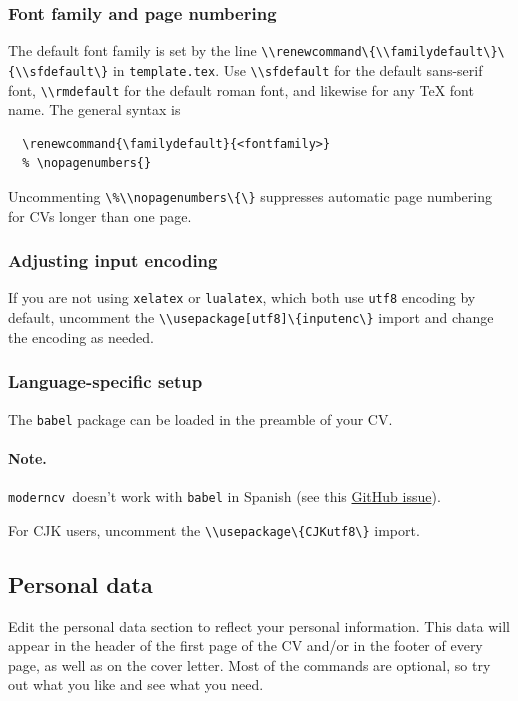 \documentclass[a4paper, 11pt]{article}
\newcommand{\note}{\paragraph{Note.}}
\newcommand{\code}[1]{\lstinline!#1!}
\newcommand{\moderncv}{\code{moderncv}}
\newcommand{\Moderncv}{\moderncv~}
\newcommand{\cvtemplate}{\code{template.tex}}
\begin{document}
\subsubsection*{Font family and page numbering}
The default font family is set by the line \code{\\renewcommand\{\\familydefault\}\{\\sfdefault\}} in \cvtemplate.
Use \code{\\sfdefault} for the default sans-serif font, \code{\\rmdefault} for the default roman font, and likewise for any \TeX{} font name.
The general syntax is
\begin{lstlisting}
  \renewcommand{\familydefault}{<fontfamily>}
  % \nopagenumbers{}
\end{lstlisting}
Uncommenting \code{\%\\nopagenumbers\{\}} suppresses automatic page numbering for CVs longer than one page.

\subsubsection*{Adjusting input encoding}
If you are not using \code{xelatex} or \code{lualatex}, which both use \code{utf8} encoding by default, uncomment the \code{\\usepackage[utf8]\{inputenc\}} import and change the encoding as needed.

\subsubsection{Language-specific setup}
The \code{babel} package can be loaded in the preamble of your CV.

\note \Moderncv doesn't work with \code{babel} in Spanish (see this \href{https://github.com/moderncv/moderncv/issues/103}{GitHub issue}).

For CJK users, uncomment the \code{\\usepackage\{CJKutf8\}} import.

\subsection{Personal data}
Edit the personal data section to reflect your personal information.
This data will appear in the header of the first page of the CV and/or in the footer of every page, as well as on the cover letter.
Most of the commands are optional, so try out what you like and see what you need.
\end{document}
